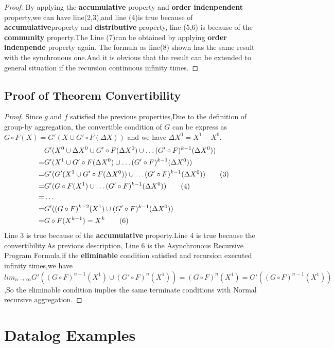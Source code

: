 \begin{appendix}
\begin{proof}
By applying the \textbf{accumulative} property and \textbf{order indenpendent} property,we can have line(2,3),and line (4)is true because of \textbf{accumulative}property
and \textbf{distributive} property, line (5,6) is because of the \textbf{community} property.The Line (7)can be obtained by applying \textbf{order indenpende} property again.
The formula as line(8) shown has the same result with the synchronous one.And it is obvious that the result can be extended to general situation if the recursion continuous infinity times.
 \end{proof}
 \subsection{Proof of Theorem Convertibility}
 \begin{proof}
 	\label{sec:app:proof:convert}
 	Since $g$ and $f$ satisfied the previous properties,Due to the definition of group-by aggregation, the convertible condition of $G$ can be express as $G\circ F(X)=G'(X\cup G'\circ F(\Delta X))$ and we have $\Delta X^0=X^1-X^0$.
 \begin{align}
&G'(X^0\cup \Delta X^0 \cup G'\circ F(\Delta X^0)\cup \ldots (G' \circ F)^{k-1}(\Delta X^0 )) \notag\\
=&G'(X^1 \cup G'\circ F(\Delta X^0  )\cup \ldots (G' \circ F)^{k-1}(\Delta X^0  )) \notag\\
=&G'(G'(X^1\cup G'\circ F(\Delta X^0  ))\cup \ldots (G' \circ F)^{k-1}(\Delta X^0 )) \tag{3}\\
=&G'(G\circ F(X^1)\cup \ldots (G' \circ F)^{k-1}(\Delta X^0 )) \tag{4}\\
=&\ldots \notag\\
=&G'((G\circ F)^{k-2}(X^1)\cup(G' \circ F)^{k-1}(\Delta X^0 )) \notag\\
=&G\circ F(X^{k-1})=X^k\tag{6}
 \end{align}
Line 3 is true because of the \textbf{accumulative} property.Line 4 is true because the convertibility.As previous description, Line 6 is the Asynchronous Recursive Program Formula.if the \textbf{eliminable} condition satisfied and recursion executed infinity times,we have $lim_{n\rightarrow\infty}G'((G\circ F)^{n-1}(X^1)\cup (G' \circ F)^{n}(X^1))=(G\circ F)^{n}(X^1)=G'((G\circ F)^{n-1}(X^1))$,So the eliminable condition implies the same terminate conditions with Normal recursive aggregation.

 \end{proof}

 \section{Datalog Examples}
 \label{sec:app:example}
 

\end{appendix}
